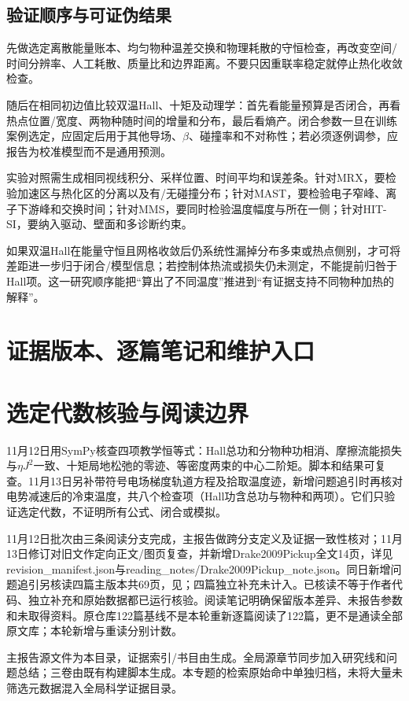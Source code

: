 \documentclass[UTF8,a4paper,11pt,openany,fontset=fandol]{ctexbook}
\begin{document}
\section{验证顺序与可证伪结果}
先做选定离散能量账本、均匀物种温差交换和物理耗散的守恒检查，再改变空间/时间分辨率、人工耗散、质量比和边界距离。不要只因重联率稳定就停止热化收敛检查。

随后在相同初边值比较双温Hall、十矩及动理学：首先看能量预算是否闭合，再看热点位置/宽度、两物种随时间的增量和分布，最后看熵产。闭合参数一旦在训练案例选定，应固定后用于其他导场、$\beta$、碰撞率和不对称性；若必须逐例调参，应报告为校准模型而不是通用预测。

实验对照需生成相同视线积分、采样位置、时间平均和误差条。针对MRX，要检验加速区与热化区的分离以及有/无碰撞分布；针对MAST，要检验电子窄峰、离子下游峰和交换时间；针对MMS，要同时检验温度幅度与所在一侧；针对HIT-SI，要纳入驱动、壁面和多诊断约束。

如果双温Hall在能量守恒且网格收敛后仍系统性漏掉分布多束或热点侧别，才可将差距进一步归于闭合/模型信息；若控制体热流或损失仍未测定，不能提前归咎于Hall项。这一研究顺序能把“算出了不同温度”推进到“有证据支持不同物种加热的解释”。

\appendix
\chapter{证据版本、逐篇笔记和维护入口}

\chapter{选定代数核验与阅读边界}
11月12日用SymPy核查四项教学恒等式：Hall总功和分物种功相消、摩擦流能损失与$\eta J^2$一致、十矩局地松弛的零迹、等密度两束的中心二阶矩。脚本和结果可复查。11月13日另补带符号电场梯度轨道方程及拾取温度迹，新增问题追引时再核对电势减速后的冷束温度，共八个检查项（Hall功含总功与物种和两项）。它们只验证选定代数，不证明所有公式、闭合或模拟。

11月12日批次由三条阅读分支完成，主报告做跨分支定义及证据一致性核对；11月13日修订对旧文作定向正文/图页复查，并新增Drake2009Pickup全文14页，详见revision\_manifest.json与reading\_notes/Drake2009Pickup\_note.json。同日新增问题追引另核读四篇主版本共69页，见；四篇独立补充未计入。已核读不等于作者代码、独立补充和原始数据都已运行核验。阅读笔记明确保留版本差异、未报告参数和未取得资料。原仓库122篇基线不是本轮重新逐篇阅读了122篇，更不是通读全部原文库；本轮新增与重读分别计数。

主报告源文件为本目录，证据索引/书目由生成。全局源章节同步加入研究线和问题总结；三卷由既有构建脚本生成。本专题的检索原始命中单独归档，未将大量未筛选元数据混入全局科学证据目录。

\backmatter


\end{document}
